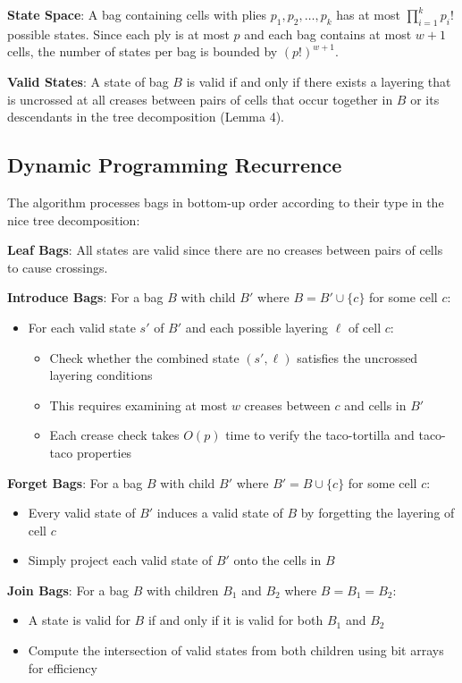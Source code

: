 \textbf{State Space}: A bag containing cells with plies $p_1, p_2, \ldots, p_k$ has at most $\prod_{i=1}^k p_i!$ possible states. Since each ply is at most $p$ and each bag contains at most $w+1$ cells, the number of states per bag is bounded by $(p!)^{w+1}$.

\textbf{Valid States}: A state of bag $B$ is valid if and only if there exists a layering that is uncrossed at all creases between pairs of cells that occur together in $B$ or its descendants in the tree decomposition (Lemma 4).

\subsection{Dynamic Programming Recurrence}

The algorithm processes bags in bottom-up order according to their type in the nice tree decomposition:

\textbf{Leaf Bags}: All states are valid since there are no creases between pairs of cells to cause crossings.

\textbf{Introduce Bags}: For a bag $B$ with child $B'$ where $B = B' \cup \{c\}$ for some cell $c$:
\begin{itemize}
\item For each valid state $s'$ of $B'$ and each possible layering $\ell$ of cell $c$:
\begin{itemize}
\item Check whether the combined state $(s', \ell)$ satisfies the uncrossed layering conditions
\item This requires examining at most $w$ creases between $c$ and cells in $B'$
\item Each crease check takes $O(p)$ time to verify the taco-tortilla and taco-taco properties
\end{itemize}
\end{itemize}

\textbf{Forget Bags}: For a bag $B$ with child $B'$ where $B' = B \cup \{c\}$ for some cell $c$:
\begin{itemize}
\item Every valid state of $B'$ induces a valid state of $B$ by forgetting the layering of cell $c$
\item Simply project each valid state of $B'$ onto the cells in $B$
\end{itemize}

\textbf{Join Bags}: For a bag $B$ with children $B_1$ and $B_2$ where $B = B_1 = B_2$:
\begin{itemize}
\item A state is valid for $B$ if and only if it is valid for both $B_1$ and $B_2$
\item Compute the intersection of valid states from both children using bit arrays for efficiency
\end{itemize}

